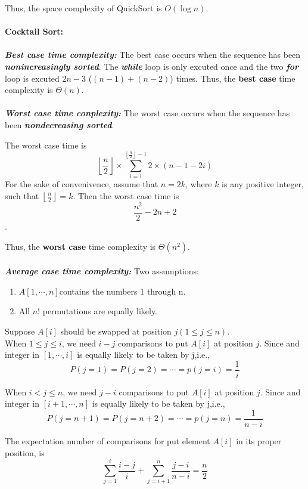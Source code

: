 \documentclass[12pt,a4paper]{article}
\theoremstyle{definition}
\begin{document}
\begin{enumerate}
\begin{enumerate}
Thus, the space complexity of QuickSort is $O(\log n)$.
\\
\\
{\large \textbf{\textbf{Cocktail Sort:}}}~
\\
\\
\textbf{\textit{Best case time complexity:}} The best case occurs when the sequence has been \emph{\textbf{nonincreasingly sorted}}. The \textbf{\textit{while}} loop is only excuted once and the two \textbf{\textit{for}} loop is excuted $2n-3$ ($(n-1)+(n-2)$) times. Thus, the \textbf{best case} time complexity is $\Theta(n)$.
\\
\\
\textbf{\textit{Worst case time conplexity:}} The worst case occurs when the sequence has been \emph{\textbf{nondecreasing sorted}}.  

The worst case time is 
$$\left\lfloor \frac{n}{2} \right\rfloor \times \sum_{i=1}^{\left\lfloor \frac{n}{2} \right\rfloor-1}2\times(n-1-2i)$$
For the sake of convenivence, assume that $n=2k$, where $k$ is any positive integer, such that $\left\lfloor \frac{n}{2} \right\rfloor=k$. Then the worst case time is $$\frac{n^2}{2}-2n+2$$.

Thus, the \textbf{worst case} time complexity is $\Theta(n^2)$.
\\
\\
\textbf{\textit{Average case time complexity:}} Two assumptions:
\begin{enumerate}
\item $A[1,\cdots,n]$contains the numbers 1 through n.
\item All $n!$ permutations are equally likely.
\end{enumerate}

Suppose $A[i]$ should be swapped at position $j(1\leq j \leq n)$.  \\

When $1\leq j\leq i$, we need $i-j$ comparisons to put $A[i]$ at position $j$.  Since and integer in $[1,\cdots,i]$ is equally likely to be taken by j,i.e.,
$$P(j=1)=P(j=2)=\cdots=p(j=i)=\frac{1}{i}$$

When $i< j\leq n$, we need $j-i$ comparisons to put $A[i]$ at position $j$.  Since and integer in $[i+1,\cdots,n]$ is equally likely to be taken by j,i.e.,
$$P(j=n+1)=P(j=n+2)=\cdots=p(j=n)=\frac{1}{n-i}$$

The expectation number of comparisons for put element $A[i]$ in its proper position, is
$$\sum_{j=1}^i \frac{i-j}{i}+\sum_{j=i+1}^n\frac{j-i}{n-i}=\frac{n}{2}$$


\end{enumerate}
\end{enumerate}
\end{document}
